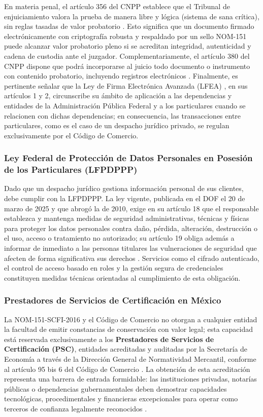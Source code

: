 En materia penal, el artículo 356 del CNPP establece que el Tribunal de enjuiciamiento valora la prueba de manera libre y lógica (sistema de sana crítica), sin reglas tasadas de valor probatorio \cite{cnpp2021}. Esto significa que un documento firmado electrónicamente con criptografía robusta y respaldado por un sello NOM-151 puede alcanzar valor probatorio pleno si se acreditan integridad, autenticidad y cadena de custodia ante el juzgador. Complementariamente, el artículo 380 del CNPP dispone que podrá incorporarse al juicio todo documento o instrumento con contenido probatorio, incluyendo registros electrónicos \cite{cnpp2021}. Finalmente, es pertinente señalar que la Ley de Firma Electrónica Avanzada (LFEA) \cite{lfea2012}, en sus artículos 1 y 2, circunscribe su ámbito de aplicación a las dependencias y entidades de la Administración Pública Federal y a los particulares cuando se relacionen con dichas dependencias; en consecuencia, las transacciones entre particulares, como es el caso de un despacho jurídico privado, se regulan exclusivamente por el Código de Comercio.

\subsubsection{Ley Federal de Protección de Datos Personales en Posesión de los Particulares (LFPDPPP)}

Dado que un despacho jurídico gestiona información personal de sus clientes, debe cumplir con la LFPDPPP. La ley vigente, publicada en el DOF el 20 de marzo de 2025 y que abrogó la de 2010, exige en su artículo 18 que el responsable establezca y mantenga medidas de seguridad administrativas, técnicas y físicas para proteger los datos personales contra daño, pérdida, alteración, destrucción o el uso, acceso o tratamiento no autorizado; su artículo 19 obliga además a informar de inmediato a las personas titulares las vulneraciones de seguridad que afecten de forma significativa sus derechos \cite{lfpdppp2025}. Servicios como el cifrado autenticado, el control de acceso basado en roles y la gestión segura de credenciales constituyen medidas técnicas orientadas al cumplimiento de esta obligación.

\subsubsection{Prestadores de Servicios de Certificación en México}

La NOM-151-SCFI-2016 y el Código de Comercio no otorgan a cualquier entidad la facultad de emitir constancias de conservación con valor legal; esta capacidad está reservada exclusivamente a los \textbf{Prestadores de Servicios de Certificación (PSC)}, entidades acreditadas y auditadas por la Secretaría de Economía a través de la Dirección General de Normatividad Mercantil, conforme al artículo 95 bis 6 del Código de Comercio \cite{economia2026}. La obtención de esta acreditación representa una barrera de entrada formidable: las instituciones privadas, notarías públicas o dependencias gubernamentales deben demostrar capacidades tecnológicas, procedimentales y financieras excepcionales para operar como terceros de confianza legalmente reconocidos \cite{economia2026}.

